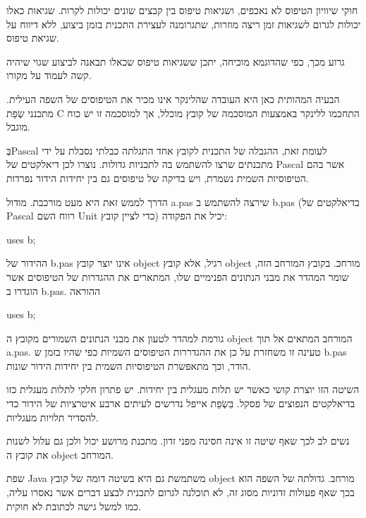       חוקי שיוויון הטיפוס לא נאכפים, ושגיאות טיפוס בין קבצים שונים יכולות לקרות. שגיאות כאלו יכולות לגרום לשגיאות זמן ריצה מוזרות, שתגרומנה לעצירת התכנית בזמן ביצוע, ללא דיווח על שגיאת טיפוס.

      גרוע מכך, כפי שהדוגמא מוכיחה, יתכן ששגיאות טיפוס שכאלו תבאנה לביצוע שגוי שיהיה קשה לעמוד על מקורו.

      הבעיה המהותית כאן היא העובדה שהלינקר אינו מכיר את הטיפוסים של השפה העילית. מתכנני שְׂפַת C התחכמו ללינקר באמצעות המוסכמה של קובץ מוכלל, אך למוסכמה זו יש כוח מוגבל.

      בְּPascal לעומת זאת, ההגבלה של התכנית לקובץ אחד התגלתה כבלתי נסבלת על ידי מתכנתים שרצו להשתמש בה לתכניות גדולות. נוצרו לכן דיאלקטים של Pascal אשר בהם הטיפוסיות השמית נשמרת, ויש בדיקה של טיפוסים גם בין יחידות הידור נפרדות.

      הדרך לממש זאת היא מעט מורכבת. מודול a.pas שירצה להשתמש ב b.pas (בדיאלקטים של Pascal רווח השם Unit כדי לציין קובץ) יכיל את הפקודה:

      uses b;

      ההידור של b.pas אינו יוצר קובץ object רגיל, אלא קובץ object מורחכ. בקובץ המורחב הזה, שומר המהדר את מבני הנתונים הפנימיים שלו, המתארים את ההגדרות של הטיפוסים אשר הוגדרו ב b.pas. ההוראה

      uses b;

      גורמת למהדר לטעון את מבני הנתונים השמורים מקובץ ה object המורחב המתאים אל תוך a.pas. טעינה זו משחזרת על כן את ההגדררות הטיפוסים השמיות כפי שהיו בזמן ש b.pas הודר, וכך מתאפשרת הטיפוסיות השמית בין יחידות הידור שונות.

      השיטה הזו יוצרת קושי כאשר יש תלות מעגלית בין יחידות. יש פתרון חלקי לתלות מעגלית כזו בדיאלקטים הנפוצים של פסקל. בִּשְׂפַת אייפל נדרשים לעיתים ארבע איטרציות של הידור כדי להסדיר תלויות מעגליות.

      נשים לב לכך שאף שיטה זו אינה חסינה מפני זדון. מתכנת מרושע יכול ולכן גם עלול לשנות את קובץ ה object המורחב.

      שפת Java משתמשת גם היא בשיטה דומה של קובץ object מורחב. גדולתה של השפה הוא בכך שאף פעולות זדוניות מסוג זה, לא תוכלנה לגרום לתכנית לבצע דברים אשר נאסרו עליה, כמו למשל גישה לכתובת לא חוקית.

